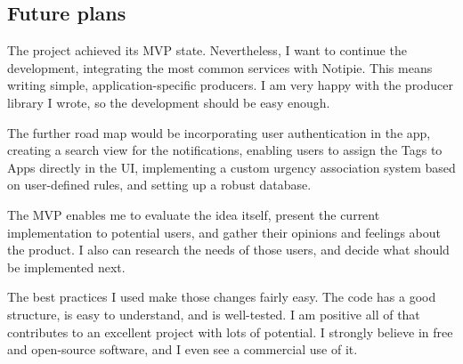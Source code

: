 \subsection{Future plans}\label{sec:future-plans}

The project achieved its \ac{MVP} state.
Nevertheless, I want to continue the development,
integrating the most common services
with Notipie.
This means writing simple,
application-specific producers.
I am very happy with the producer library I wrote,
so the development should be easy enough.

The further road map would be
incorporating user authentication in the app,
creating a search view for the notifications,
enabling users to assign the Tags to Apps
directly in the \ac{UI},
implementing a custom urgency association system
based on user-defined rules,
and setting up a robust database.

The \ac{MVP} enables me to evaluate the idea itself,
present the current implementation to potential users,
and gather their opinions and feelings about the product.
I also can research the needs of those users,
and decide what should be implemented next.

The best practices I used make those changes
fairly easy.
The code has a good structure,
is easy to understand,
and is well-tested.
I am positive all of that contributes
to an excellent project
with lots of potential.
I strongly believe in
free and open-source software,
and I even see a commercial use of it.
